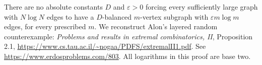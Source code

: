 There are no absolute constants \(D\) and \(\varepsilon>0\)
forcing every sufficiently large graph with \(N\log N\)
edges to have a \(D\)-balanced \(m\)-vertex subgraph with
\(\varepsilon m\log m\) edges, for every prescribed \(m\).
We reconstruct Alon's layered random counterexample:
\emph{Problems and results in extremal combinatorics, II},
Proposition 2.1,
\url{https://www.cs.tau.ac.il/~nogaa/PDFS/extremalII1.pdf}.
See \url{https://www.erdosproblems.com/803}.
All logarithms in this proof are base two.
